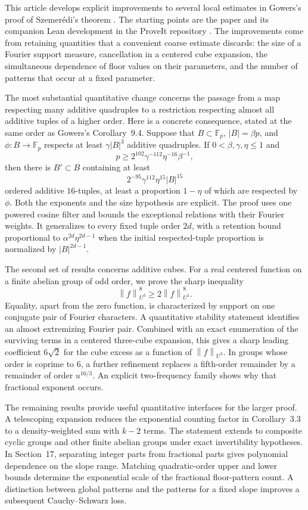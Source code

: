 \documentclass[11pt,letterpaper]{article}
\numberwithin{equation}{section}
\theoremstyle{definition}
\theoremstyle{remark}
\newcommand{\F}{\mathbb F}
\newcommand{\1}{\mathbf 1}
\newcommand{\norm}[1]{\left\|#1\right\|}
\begin{document}
This article develops explicit improvements to several local estimates in
Gowers's proof of Szemer\'edi's theorem \cite{gowers}.  The starting
points are the paper and its companion Lean development in the ProveIt
repository \cite{repo04}.  The improvements come from retaining quantities
that a convenient coarse estimate discards: the size of a Fourier support
measure, cancellation in a centered cube expansion, the simultaneous
dependence of floor values on their parameters, and the number of patterns
that occur at a fixed parameter.

The most substantial quantitative change concerns the passage from a map
respecting many additive quadruples to a restriction respecting almost all
additive tuples of a higher order.  Here is a concrete consequence, stated
at the same order as Gowers's Corollary~9.4.
Suppose that \(B\subset\F_p\), \(|B|=\beta p\), and
\(\phi:B\to\F_p\) respects at least \(\gamma|B|^3\) additive quadruples.
If \(0<\beta,\gamma,\eta\leq1\) and
\[
 p\geq 2^{102}\gamma^{-112}\eta^{-16}\beta^{-1},
\]
then there is \(B'\subset B\) containing at least
\[
 2^{-95}\gamma^{112}\eta^{15}|B|^{15}
\]
ordered additive \(16\)-tuples, at least a proportion \(1-\eta\) of which
are respected by \(\phi\).  Both the exponents and the size hypothesis
are explicit.  The proof uses one powered cosine filter and bounds the
exceptional relations with their Fourier weights.  It generalizes to every fixed
tuple order \(2d\), with a retention bound proportional to
\(\alpha^{2d}\eta^{2d-1}\) when the initial respected-tuple proportion is
normalized by \(|B|^{2d-1}\).

The second set of results concerns additive cubes.  For a real centered
function on a finite abelian group of odd order, we prove the sharp inequality
\[
 \norm{f}_{U^3}^{8}\geq 2\norm{f}_{U^2}^{8}.
\]
Equality, apart from the zero function, is characterized by support on
one conjugate pair of Fourier characters.  A quantitative stability
statement identifies an almost extremizing Fourier pair.  Combined with
an exact enumeration of the surviving terms in a centered three-cube
expansion, this gives a sharp leading coefficient \(6\sqrt2\) for the
cube excess as a function of \(\norm f_{U^3}\).  In groups whose order is
coprime to \(6\), a further refinement replaces a fifth-order remainder
by a remainder of order \(u^{16/3}\).  An explicit two-frequency family
shows why that fractional exponent occurs.

The remaining results provide useful quantitative interfaces for the
larger proof.  A telescoping expansion reduces the exponential counting
factor in Corollary~3.3 to a density-weighted sum with \(k-2\) terms.
The statement extends to composite cyclic groups and other finite
abelian groups under exact invertibility hypotheses.  In Section~17,
separating integer parts from fractional parts gives polynomial
dependence on the slope range.  Matching quadratic-order upper and lower
bounds determine the exponential scale of the fractional floor-pattern
count.  A distinction between global patterns and the patterns for a fixed
slope improves a subsequent Cauchy--Schwarz loss.
\end{document}
